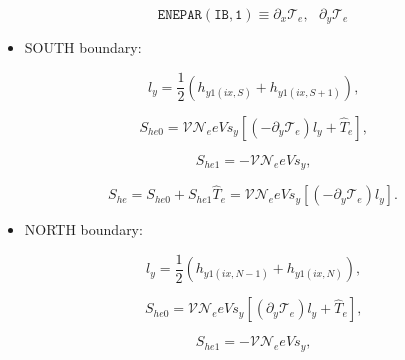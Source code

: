 \documentclass[11pt]{article}
\begin{document}
\bigskip

\begin{equation*}
\mathtt{ENEPAR(IB,1)}\equiv\partial_{x}\mathcal{T}_{e},\text{ }\partial _{y}%
\mathcal{T}_{e}
\end{equation*}

\bigskip

\begin{itemize}
\item  SOUTH boundary:
\end{itemize}

\bigskip

\begin{equation}
l_{y}=\frac{1}{2}\left( h_{y1\left( ix,S\right) }+h_{y1\left( ix,S+1\right)
}\right) \text{,}   \label{c169a}
\end{equation}

\begin{equation}
S_{he0}=\mathcal{VN}_{e}eVs_{y}\left[ \left( -\partial_{y}\mathcal{T}%
_{e}\right) l_{y}+\widehat{T}_{e}\right] \text{,}   \label{c169}
\end{equation}

\begin{equation}
S_{he1}=-\mathcal{VN}_{e}eVs_{y}\text{,}   \label{c170}
\end{equation}

\begin{equation}
S_{he}=S_{he0}+S_{he1}\widehat{T}_{e}=\mathcal{VN}_{e}eVs_{y}\left[ \left(
-\partial_{y}\mathcal{T}_{e}\right) l_{y}\right] \text{.}   \label{c171}
\end{equation}

\bigskip

\begin{itemize}
\item  NORTH boundary:
\end{itemize}

\bigskip

\begin{equation}
l_{y}=\frac{1}{2}\left( h_{y1\left( ix,N-1\right) }+h_{y1\left( ix,N\right)
}\right) \text{,}   \label{c172a}
\end{equation}

\begin{equation}
S_{he0}=\mathcal{VN}_{e}eVs_{y}\left[ \left( \partial_{y}\mathcal{T}%
_{e}\right) l_{y}+\widehat{T}_{e}\right] \text{,}   \label{c172}
\end{equation}

\begin{equation}
S_{he1}=-\mathcal{VN}_{e}eVs_{y}\text{,}   \label{c173}
\end{equation}
\end{document}
